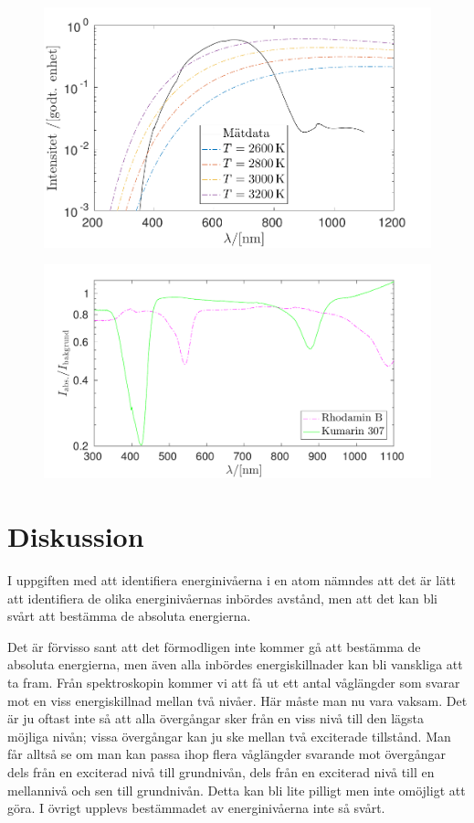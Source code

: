 \documentclass[11pt,a4paper]{article}
\begin{document}
\begin{figure}\centering
\centerline{ %
\includegraphics[width=.9\textwidth]{svartkropp.pdf}
}
\caption{\label{fig:svartkropp} }
\end{figure}

\begin{figure}\centering
\centerline{ %
\includegraphics[width=1\textwidth]{absorption.pdf}
}
\caption{\label{fig:absorption} }
\end{figure}



\section{Diskussion}
I uppgiften med att identifiera energinivåerna i en atom nämndes att det är lätt att identifiera de olika energinivåernas inbördes avstånd, men att det kan bli svårt att bestämma de absoluta energierna. 

Det är förvisso sant att det förmodligen inte kommer gå att bestämma de absoluta energierna, men även alla inbördes energiskillnader kan bli vanskliga att ta fram. Från spektroskopin kommer vi att få ut ett antal våglängder som svarar mot en viss energi\-skillnad mellan två nivåer. Här måste man nu vara vaksam. Det är ju oftast inte så att alla övergångar sker från en viss nivå till den lägsta möjliga nivån; vissa övergångar kan ju ske mellan två exciterade tillstånd. Man får alltså se om man kan passa ihop flera våglängder svarande mot övergångar dels från en exciterad nivå till grundnivån, dels från en exciterad nivå till en mellannivå och sen till grundnivån. Detta kan bli lite pilligt men inte omöjligt att göra. I övrigt upplevs bestämmadet av energinivåerna inte så svårt. 
\end{document}
